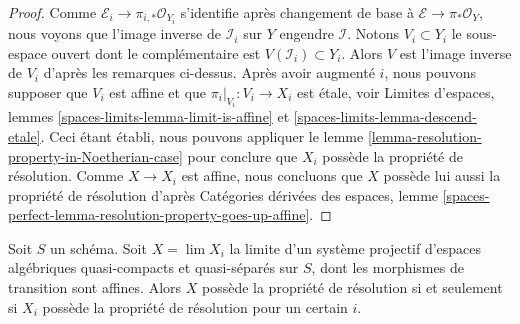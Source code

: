 \begin{proof}
Comme $\mathcal{E}_i \to \pi_{i, *}\mathcal{O}_{Y_i}$
s'identifie après changement de base à $\mathcal{E} \to \pi_*\mathcal{O}_Y$, nous
voyons que l'image inverse de $\mathcal{I}_i$ sur $Y$ engendre $\mathcal{I}$.
Notons $V_i \subset Y_i$ le sous-espace ouvert dont le complémentaire
est $V(\mathcal{I}_i) \subset Y_i$. Alors $V$ est l'image inverse
de $V_i$ d'après les remarques ci-dessus. Après avoir augmenté $i$, nous pouvons supposer
que $V_i$ est affine et que $\pi_i|_{V_i} : V_i \to X_i$ est 
\'etale, voir
Limites d'espaces, lemmes
\ref{spaces-limits-lemma-limit-is-affine} et
\ref{spaces-limits-lemma-descend-etale}.
Ceci étant établi, nous pouvons appliquer le
lemme \ref{lemma-resolution-property-in-Noetherian-case}
pour conclure que $X_i$ possède la
propriété de résolution. Comme $X \to X_i$ est affine,
nous concluons que $X$ possède lui aussi la propriété de résolution
d'après Catégories dérivées des espaces, lemme
\ref{spaces-perfect-lemma-resolution-property-goes-up-affine}.
\end{proof}

\begin{lemma}
\label{lemma-resolution-property-descends}
Soit $S$ un schéma.
Soit $X = \lim X_i$ la limite d'un système projectif d'espaces algébriques quasi-compacts
et quasi-séparés sur $S$, dont les morphismes de transition sont affines.
Alors $X$ possède la propriété de résolution si et seulement si $X_i$ possède
la propriété de résolution pour un certain $i$.
\end{lemma}


